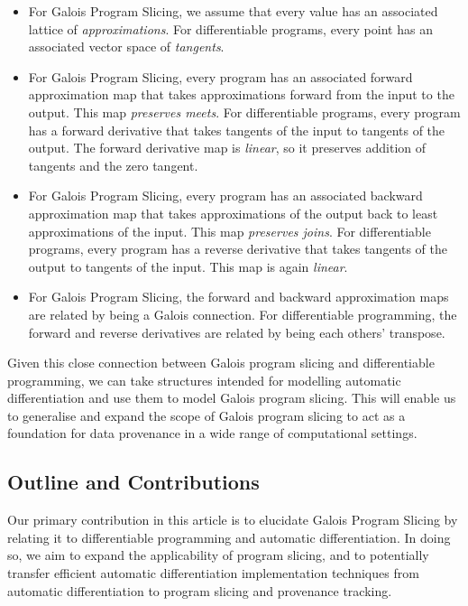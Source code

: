 \begin{itemize}
\item For Galois Program Slicing, we assume that every value has an associated lattice of {\em approximations}. For differentiable programs, every point has an associated vector space of {\em tangents}.
\item For Galois Program Slicing, every program has an associated forward approximation map that takes approximations forward from the input to the output. This map {\em preserves meets}. For differentiable programs, every program has a forward derivative that takes tangents of the input to tangents of the output. The forward derivative map is {\em linear}, so it preserves addition of tangents and the zero tangent.
\item For Galois Program Slicing, every program has an associated backward approximation map that takes approximations of the output back to least approximations of the input. This map {\em preserves joins}. For differentiable programs, every program has a reverse derivative that takes tangents of the output to tangents of the input. This map is again {\em linear}.
\item For Galois Program Slicing, the forward and backward approximation maps are related by being a Galois connection. For differentiable programming, the forward and reverse derivatives are related by being each others' transpose.
\end{itemize}

Given this close connection between Galois program slicing and differentiable programming, we can take structures intended for modelling automatic differentiation and use them to model Galois program slicing. This will enable us to generalise and expand the scope of Galois program slicing to act as a foundation for data provenance in a wide range of computational settings.

\subsection{Outline and Contributions}

Our primary contribution in this article is to elucidate Galois Program Slicing by relating it to differentiable programming and automatic differentiation. In doing so, we aim to expand the applicability of program slicing, and to potentially transfer efficient automatic differentiation implementation techniques from automatic differentiation to program slicing and provenance tracking.

